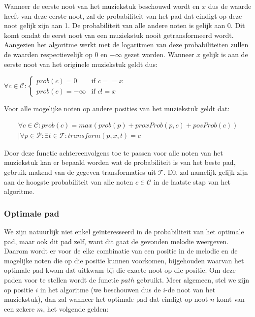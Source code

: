 Wanneer de eerste noot van het muziekstuk beschouwd wordt en $x$ dus de waarde heeft van deze eerste noot, zal de probabiliteit van het pad dat eindigt op deze noot gelijk zijn aan 1. De probabiliteit van alle andere noten is gelijk aan 0. Dit komt omdat de eerst noot van een muziekstuk nooit getransformeerd wordt. Aangezien het algoritme werkt met de logaritmen van deze probabiliteiten zullen de waarden respectievelijk op 0 en $-\infty$ gezet worden. Wanneer $x$ gelijk is aan de eerste noot van het originele muziekstuk geldt dus:

\begin{framed}
\noindent
$\forall c\in \mathcal{C}: \begin{cases} 
prob(c)=0 &\mbox{if } c==x\\ 
prob(c)=-\infty &\mbox{if } c!=x \end{cases}$
\end{framed}

Voor alle mogelijke noten op andere posities van het muziekstuk geldt dat:

\begin{framed}
\noindent
\begin{multline}
\forall c\in \mathcal{C}: 
prob(c) = max(prob(p) + proxProb(p,c) + posProb(c)) \\
| \forall p\in \mathcal{P}: \exists t\in \mathcal{T}: transform(p,x,t)=c
\end{multline}
\end{framed}

Door deze functie achtereenvolgens toe te passen voor alle noten van het muziekstuk kan er bepaald worden wat de probabiliteit is van het beste pad, gebruik makend van de gegeven transformaties uit $\mathcal{T}$. Dit zal namelijk gelijk zijn aan de hoogste probabiliteit van alle noten $c\in \mathcal{C}$ in de laatste stap van het algoritme.

\subsubsection{Optimale pad}
We zijn natuurlijk niet enkel ge\"interesseerd in de probabiliteit van het optimale pad, maar ook dit pad zelf, want dit gaat de gevonden melodie weergeven. Daarom wordt er voor de elke combinatie van een positie in de melodie en de mogelijke noten die op die positie kunnen voorkomen, bijgehouden waarvan het optimale pad kwam dat uitkwam bij die exacte noot op die positie. Om deze paden voor te stellen wordt de functie $path$ gebruikt. Meer algemeen, stel we zijn op positie $i$ in het algoritme (we beschouwen dus de $i$-de noot van het muziekstuk), dan zal wanneer het optimale pad dat eindigt op noot $n$ komt van een zekere $m$, het volgende gelden:

